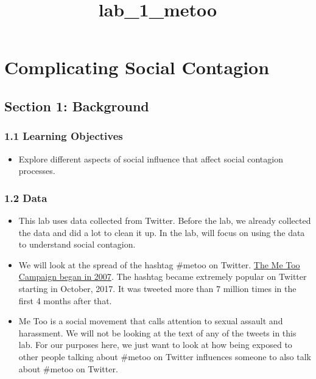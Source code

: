 \documentclass[11pt]{article}
\title{lab\_1\_metoo}
\providecommand{\tightlist}{%
      \setlength{\itemsep}{0pt}\setlength{\parskip}{0pt}}
\begin{document}
    
    
    \maketitle
    
    

    
    \hypertarget{complicating-social-contagion}{%
\section{Complicating Social
Contagion}\label{complicating-social-contagion}}

    \hypertarget{section-1-background}{%
\subsection{Section 1: Background}\label{section-1-background}}

\hypertarget{learning-objectives}{%
\subsubsection{1.1 Learning Objectives}\label{learning-objectives}}

\begin{itemize}
\tightlist
\item
  Explore different aspects of social influence that affect social
  contagion processes.
\end{itemize}

\hypertarget{data}{%
\subsubsection{1.2 Data}\label{data}}

\begin{itemize}
\tightlist
\item
  This lab uses data collected from Twitter. Before the lab, we already
  collected the data and did a lot to clean it up. In the lab, will
  focus on using the data to understand social contagion.
\item
  We will look at the spread of the hashtag \#metoo on Twitter.
  \href{https://www.nytimes.com/2017/10/20/us/me-too-movement-tarana-burke.html}{The
  Me Too Campaign began in 2007}. The hashtag became extremely popular
  on Twitter starting in October, 2017. It was tweeted more than 7
  million times in the first 4 months after that.
\item
  Me Too is a social movement that calls attention to sexual assault and
  harassment. We will not be looking at the text of any of the tweets in
  this lab. For our purposes here, we just want to look at how being
  exposed to other people talking about \#metoo on Twitter influences
  someone to also talk about \#metoo on Twitter.
\end{itemize}
\end{document}
